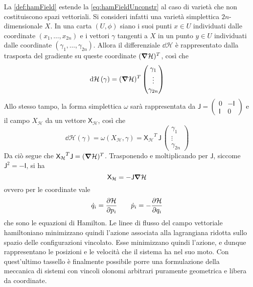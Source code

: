 La \autoref{def:hamField} estende la \autoref{eq:hamFieldUnconstr} al caso di varietà che non costituiscono spazi vettoriali. Si consideri infatti una varietà simplettica $2n$-dimensionale $X$. In una carta $(U,\phi)$ siano i suoi punti $x \in U$ individuati dalle coordinate $(x_1, \ldots, x_{2n})$ e i vettori $\gamma$ tangenti a $X$ in un punto $y \in U$ individuati dalle coordinate $(\gamma_1, \ldots, \gamma_{2n})$. Allora il differenziale $\dd{\mathcal{H}}$ è rappresentato dalla trasposta del gradiente su queste coordinate $(\grad{\mathcal{H}})^T$, così che \begin{equation*}
\dd{\mathcal{H}}(\gamma) = (\grad{\mathcal{H}})^T \begin{pmatrix} \gamma_1\\ \vdots\\ \gamma_{2n} \end{pmatrix}
\end{equation*} 
Allo stesso tampo, la forma simplettica $\omega$ sarà rappresentata da $\mathsf{J} = \left( \begin{smallmatrix}
  0 & -\mathsf{I} \\ \mathsf{I} & 0
\end{smallmatrix}  \right) $ e il campo $X_{\mathcal{H}}$ da un vettore $\mathsf{X_{\mathcal{H}}}$, così che
\begin{equation*}
\dd{\mathcal{H}}(\gamma) = \omega(X_{\mathcal{H}}, \gamma) = \mathsf{X_{\mathcal{H}}}^T\, \mathsf{J}\, \begin{pmatrix} \gamma_1\\ \vdots\\ \gamma_{2n} \end{pmatrix}
\end{equation*} 
Da ciò segue che $\mathsf{X_{\mathcal{H}}}^T \mathsf{J} = (\grad{\mathcal{H}})^T$. Trasponendo e moltiplicando per $\mathsf{J}$, siccome $\mathsf{J}^2 =- \mathsf{I}$, si ha
\begin{equation*}
\mathsf{X}_{\mathcal{H}} = -\mathsf{J} \grad{\mathcal{H}} 
\end{equation*}
ovvero per le coordinate vale \begin{equation*}
\dot{q}_i = \pdv{\mathcal{H}}{p_i} \qquad \dot{p}_i = - \pdv{\mathcal{H}}{q_i}
\end{equation*}
che sono le equazioni di Hamilton. Le linee di flusso del campo vettoriale hamiltoniano minimizzano quindi l'azione associata alla lagrangiana ridotta sullo spazio delle configurazioni vincolato. Esse minimizzano quindi l'azione, e dunque rappresentano le posizioni e le velocità che il sistema ha nel suo moto. Con quest'ultimo tassello è finalmente possibile porre una formulazione della meccanica di sistemi con vincoli olonomi arbitrari puramente geometrica e libera da coordinate.

